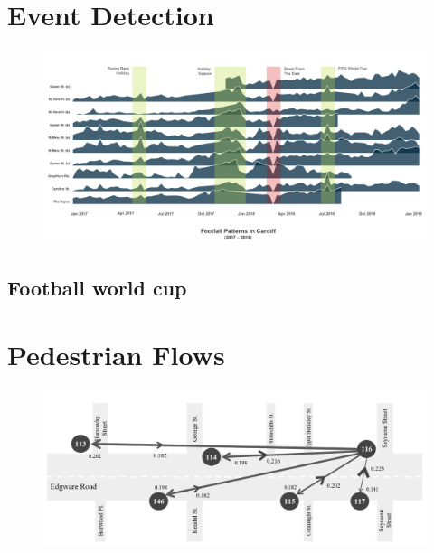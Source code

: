 \lipsum[1-2]

\section{Event Detection}

\begin{figure}
  \forceversofloat
  \includegraphics[trim={0 50 0 0},clip]{images/applications-cardiff-footfall.png}
  \caption{}
  \label{}
\end{figure}

\lipsum[1]


\subsection{Football world cup}


\section{Pedestrian Flows}

\begin{figure}
  \forceversofloat
  \includegraphics[trim={0 0 0 0},clip]{images/applications-transfer-entropy.png}
  \caption{}
  \label{}
\end{figure}

